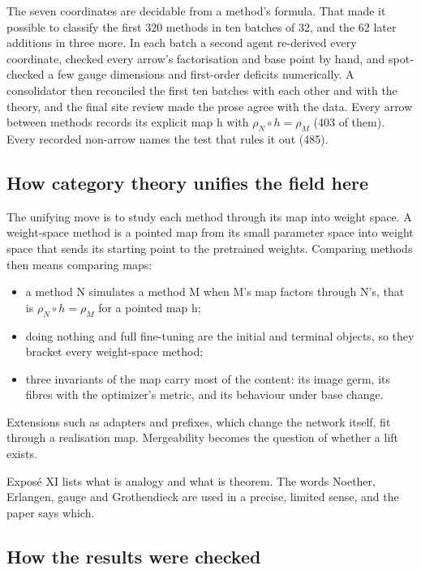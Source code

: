 The seven coordinates are decidable from a method's formula. That made it possible to classify the first 320 methods in ten batches of 32, and the 62 later additions in three more. In each batch a second agent re-derived every coordinate, checked every arrow's factorisation and base point by hand, and spot-checked a few gauge dimensions and first-order deficits numerically. A consolidator then reconciled the first ten batches with each other and with the theory, and the final site review made the prose agree with the data. Every arrow between methods records its explicit map h with $\rho_N\circ h=\rho_M$ (403 of them). Every recorded non-arrow names the test that rules it out (485).

\subsection{How category theory unifies the field here}

The unifying move is to study each method through its map into weight space. A weight-space method is a pointed map from its small parameter space into weight space that sends its starting point to the pretrained weights. Comparing methods then means comparing maps:

\begin{itemize}
\item a method N simulates a method M when M's map factors through N's, that is $\rho_N\circ h=\rho_M$ for a pointed map h;
\item doing nothing and full fine-tuning are the initial and terminal objects, so they bracket every weight-space method;
\item three invariants of the map carry most of the content: its image germ, its fibres with the optimizer's metric, and its behaviour under base change.
\end{itemize}

Extensions such as adapters and prefixes, which change the network itself, fit through a realisation map. Mergeability becomes the question of whether a lift exists.

Exposé XI lists what is analogy and what is theorem. The words Noether, Erlangen, gauge and Grothendieck are used in a precise, limited sense, and the paper says which.

\subsection{How the results were checked}

